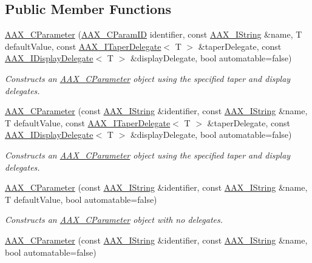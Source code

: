 \subsection*{Public Member Functions}
\begin{DoxyCompactItemize}
\item 
\hyperlink{a00033_a37efc08612535de4712bd59445ce8fbf}{A\+A\+X\+\_\+\+C\+Parameter} (\hyperlink{a00149_a1440c756fe5cb158b78193b2fc1780d1}{A\+A\+X\+\_\+\+C\+Param\+I\+D} identifier, const \hyperlink{a00113}{A\+A\+X\+\_\+\+I\+String} \&name, T default\+Value, const \hyperlink{a00114}{A\+A\+X\+\_\+\+I\+Taper\+Delegate}$<$ T $>$ \&taper\+Delegate, const \hyperlink{a00092}{A\+A\+X\+\_\+\+I\+Display\+Delegate}$<$ T $>$ \&display\+Delegate, bool automatable=false)
\begin{DoxyCompactList}\small\item\em Constructs an \hyperlink{a00033}{A\+A\+X\+\_\+\+C\+Parameter} object using the specified taper and display delegates. \end{DoxyCompactList}\item 
\hyperlink{a00033_a45c6e7e8975b0ab682785b395b80c31f}{A\+A\+X\+\_\+\+C\+Parameter} (const \hyperlink{a00113}{A\+A\+X\+\_\+\+I\+String} \&identifier, const \hyperlink{a00113}{A\+A\+X\+\_\+\+I\+String} \&name, T default\+Value, const \hyperlink{a00114}{A\+A\+X\+\_\+\+I\+Taper\+Delegate}$<$ T $>$ \&taper\+Delegate, const \hyperlink{a00092}{A\+A\+X\+\_\+\+I\+Display\+Delegate}$<$ T $>$ \&display\+Delegate, bool automatable=false)
\begin{DoxyCompactList}\small\item\em Constructs an \hyperlink{a00033}{A\+A\+X\+\_\+\+C\+Parameter} object using the specified taper and display delegates. \end{DoxyCompactList}\item 
\hyperlink{a00033_af91631db027f09bc8918082c842d1719}{A\+A\+X\+\_\+\+C\+Parameter} (const \hyperlink{a00113}{A\+A\+X\+\_\+\+I\+String} \&identifier, const \hyperlink{a00113}{A\+A\+X\+\_\+\+I\+String} \&name, T default\+Value, bool automatable=false)
\begin{DoxyCompactList}\small\item\em Constructs an \hyperlink{a00033}{A\+A\+X\+\_\+\+C\+Parameter} object with no delegates. \end{DoxyCompactList}\item 
\hyperlink{a00033_a3cba283b1eb665a511b400981aecf5e5}{A\+A\+X\+\_\+\+C\+Parameter} (const \hyperlink{a00113}{A\+A\+X\+\_\+\+I\+String} \&identifier, const \hyperlink{a00113}{A\+A\+X\+\_\+\+I\+String} \&name, bool automatable=false)

\end{DoxyCompactItemize}
